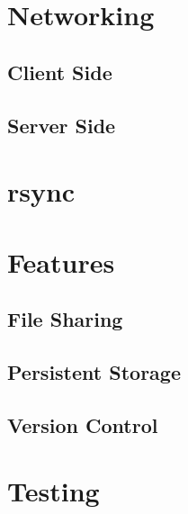 \documentclass[]{article}
\begin{document}
\section{Networking}
\subsection{Client Side}
\subsection{Server Side}
\section{rsync}

\section{Features}
\subsection{File Sharing}
\subsection{Persistent Storage}
\subsection{Version Control}

\section{Testing}
\end{document}
